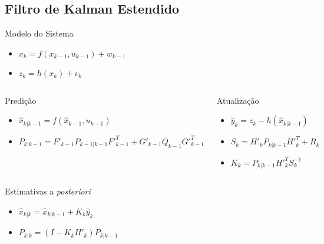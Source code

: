 
\subsection*{Filtro de Kalman Estendido}
\begin{frame}{}
	\begin{block}{Modelo do Sistema}
		\begin{itemize}
			\item $x_k = f(x_{k-1}, u_{k-1}) + w_{k-1}$\\ %
			\item $z_k = h(x_{k}) + v_{k}$ %
		\end{itemize}
%		
	\end{block}
	
	\begin{columns}
		\begin{block}{Predição}
			\begin{itemize}
				\item $\hat{x}_{k|k-1} = f(\hat{x}_{k-1}, u_{k-1})$ %
				\item $P_{k|k-1} = F'_{k-1}P_{k-1|k-1}F'^{T}_{k-1}+G'_{k-1}Q_{k-1}G'^{T}_{k-1}$ %
			\end{itemize}			
		\end{block}
		
		\begin{block}{Atualização}
			\begin{itemize}
				\item $\hat{y}_k = z_k - h(\hat{x}_{k|k-1})$ %
				\item $S_k = H'_kP_{k|k-1}H'^{T}_k+R_k$ %
				\item $K_k = P_{k|k-1}H'^T_kS^{-1}_k$ %
			\end{itemize}
		\end{block}
	\end{columns}
	
	\begin{block}{Estimativas a \textit{posteriori}}
		\begin{itemize}
			\item $\hat{x}_{k|k} = \hat{x}_{k|k-1}+K_k\hat{y}_k$ %
			\item $P_{k|k} = (I - K_kH'_k)P_{k|k-1}$ %
		\end{itemize}			
	\end{block}
\end{frame}